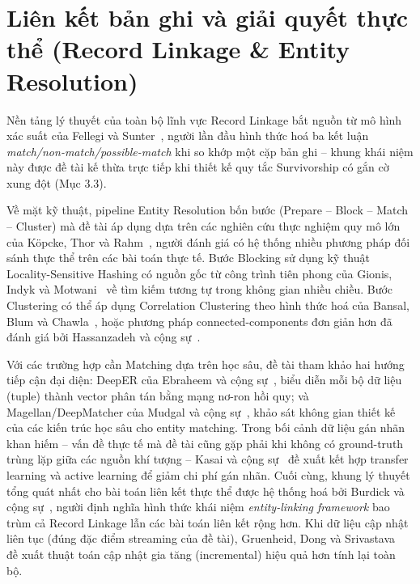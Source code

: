 \documentclass[12pt,a4paper]{report}
\begin{document}
\section{Liên kết bản ghi và giải quyết thực thể (Record Linkage \& Entity Resolution)}

Nền tảng lý thuyết của toàn bộ lĩnh vực Record Linkage bắt nguồn từ mô hình xác suất của Fellegi và Sunter~\cite{fellegi1969theory}, người lần đầu hình thức hoá ba kết luận \emph{match/non-match/possible-match} khi so khớp một cặp bản ghi -- khung khái niệm này được đề tài kế thừa trực tiếp khi thiết kế quy tắc Survivorship có gắn cờ xung đột (Mục 3.3).

Về mặt kỹ thuật, pipeline Entity Resolution bốn bước (Prepare -- Block -- Match -- Cluster) mà đề tài áp dụng dựa trên các nghiên cứu thực nghiệm quy mô lớn của Köpcke, Thor và Rahm~\cite{kopcke2010evaluation}, người đánh giá có hệ thống nhiều phương pháp đối sánh thực thể trên các bài toán thực tế. Bước Blocking sử dụng kỹ thuật Locality-Sensitive Hashing có nguồn gốc từ công trình tiên phong của Gionis, Indyk và Motwani~\cite{gionis1999similarity} về tìm kiếm tương tự trong không gian nhiều chiều. Bước Clustering có thể áp dụng Correlation Clustering theo hình thức hoá của Bansal, Blum và Chawla~\cite{bansal2004correlation}, hoặc phương pháp connected-components đơn giản hơn đã đánh giá bởi Hassanzadeh và cộng sự~\cite{hassanzadeh2009framework}.

Với các trường hợp cần Matching dựa trên học sâu, đề tài tham khảo hai hướng tiếp cận đại diện: DeepER của Ebraheem và cộng sự~\cite{ebraheem2018deeper}, biểu diễn mỗi bộ dữ liệu (tuple) thành vector phân tán bằng mạng nơ-ron hồi quy; và Magellan/DeepMatcher của Mudgal và cộng sự~\cite{mudgal2018deep}, khảo sát không gian thiết kế của các kiến trúc học sâu cho entity matching. Trong bối cảnh dữ liệu gán nhãn khan hiếm -- vấn đề thực tế mà đề tài cũng gặp phải khi không có ground-truth trùng lặp giữa các nguồn khí tượng -- Kasai và cộng sự~\cite{kasai2019lowresource} đề xuất kết hợp transfer learning và active learning để giảm chi phí gán nhãn. Cuối cùng, khung lý thuyết tổng quát nhất cho bài toán liên kết thực thể được hệ thống hoá bởi Burdick và cộng sự~\cite{burdick2017expressive}, người định nghĩa hình thức khái niệm \emph{entity-linking framework} bao trùm cả Record Linkage lẫn các bài toán liên kết rộng hơn. Khi dữ liệu cập nhật liên tục (đúng đặc điểm streaming của đề tài), Gruenheid, Dong và Srivastava~\cite{gruenheid2014incremental} đề xuất thuật toán cập nhật gia tăng (incremental) hiệu quả hơn tính lại toàn bộ.
\end{document}
